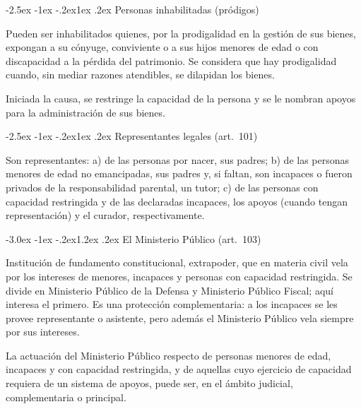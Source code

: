 \documentclass[12pt,oneside]{book}
\makeatletter
\renewcommand\section{\@startsection{section}{1}{\z@}%
  {-3.0ex \@plus -1ex \@minus -.2ex}{1.2ex \@plus .2ex}%
  {\normalfont\large\bfseries\color{acento}}}
\renewcommand\subsection{\@startsection{subsection}{2}{\z@}%
  {-2.5ex \@plus -1ex \@minus -.2ex}{1ex \@plus .2ex}%
  {\normalfont\normalsize\bfseries}}
\makeatother
\begin{document}
\subsection{Personas inhabilitadas (pródigos)}

\begin{regla}
Pueden ser inhabilitados quienes, por la prodigalidad en la gestión de sus bienes, expongan a su cónyuge, conviviente o a sus hijos menores de edad o con discapacidad a la pérdida del patrimonio. Se considera que hay prodigalidad cuando, sin mediar razones atendibles, se dilapidan los bienes.
\end{regla}

Iniciada la causa, se restringe la capacidad de la persona y se le nombran apoyos para la administración de sus bienes.

\subsection{Representantes legales (art.~101)}

\begin{regla}
Son representantes: a) de las personas por nacer, sus padres; b) de las personas menores de edad no emancipadas, sus padres y, si faltan, son incapaces o fueron privados de la responsabilidad parental, un tutor; c) de las personas con capacidad restringida y de las declaradas incapaces, los apoyos (cuando tengan representación) y el curador, respectivamente.
\end{regla}

\section{El Ministerio Público (art.~103)}

Institución de fundamento constitucional, extrapoder, que en materia civil vela por los intereses de menores, incapaces y personas con capacidad restringida. Se divide en Ministerio Público de la Defensa y Ministerio Público Fiscal; aquí interesa el primero. Es una protección complementaria: a los incapaces se les provee representante o asistente, pero además el Ministerio Público vela siempre por sus intereses.

\begin{regla}
La actuación del Ministerio Público respecto de personas menores de edad, incapaces y con capacidad restringida, y de aquellas cuyo ejercicio de capacidad requiera de un sistema de apoyos, puede ser, en el ámbito judicial, complementaria o principal.
\end{regla}
\end{document}
